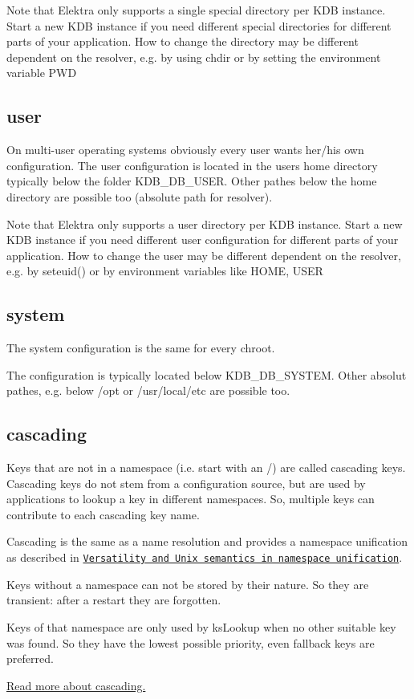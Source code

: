 Note that Elektra only supports a single special directory per K\+D\+B instance. Start a new K\+D\+B instance if you need different special directories for different parts of your application. How to change the directory may be different dependent on the resolver, e.\+g. by using chdir or by setting the environment variable P\+W\+D

\subsection*{user}

On multi-\/user operating systems obviously every user wants her/his own configuration. The user configuration is located in the users home directory typically below the folder K\+D\+B\+\_\+\+D\+B\+\_\+\+U\+S\+E\+R. Other pathes below the home directory are possible too (absolute path for resolver).

Note that Elektra only supports a user directory per K\+D\+B instance. Start a new K\+D\+B instance if you need different user configuration for different parts of your application. How to change the user may be different dependent on the resolver, e.\+g. by seteuid() or by environment variables like H\+O\+M\+E, U\+S\+E\+R

\subsection*{system}

The system configuration is the same for every chroot.

The configuration is typically located below K\+D\+B\+\_\+\+D\+B\+\_\+\+S\+Y\+S\+T\+E\+M. Other absolut pathes, e.\+g. below /opt or /usr/local/etc are possible too.

\subsection*{cascading}

Keys that are not in a namespace (i.\+e. start with an {\ttfamily /}) are called cascading keys. Cascading keys do not stem from a configuration source, but are used by applications to lookup a key in different namespaces. So, multiple keys can contribute to each cascading key name.

Cascading is the same as a name resolution and provides a namespace unification as described in \href{http://dl.acm.org/citation.cfm?id=1138045}{\tt Versatility and Unix semantics in namespace unification}.

Keys without a namespace can not be stored by their nature. So they are transient\+: after a restart they are forgotten.

Keys of that namespace are only used by ks\+Lookup when no other suitable key was found. So they have the lowest possible priority, even fallback keys are preferred.

\hyperlink{md_doc_help_elektra-cascading_doc_help_elektra-cascading_md}{Read more about cascading.} 